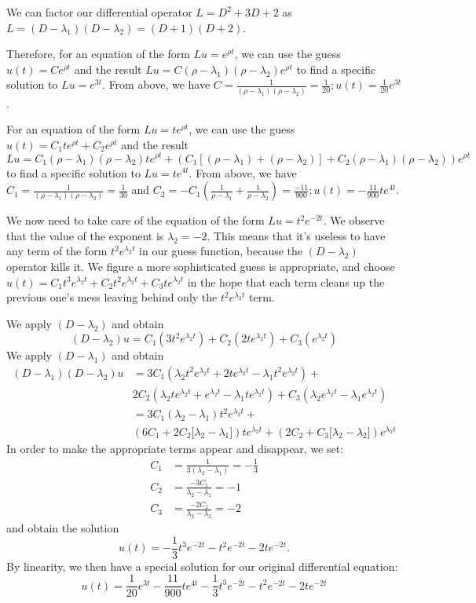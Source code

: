 \documentclass[11pt]{article}
\begin{document}
We can factor our differential operator $L=D^2 + 3D + 2$ as $L = (D-\lambda_1)(D-\lambda_2) = (D+1)(D+2)$. 

Therefore, for an equation of the form $Lu=e^{\rho t}$, we can use the guess $u(t) = Ce^{\rho t}$ and the result $Lu = C(\rho - \lambda_1)(\rho - \lambda_2)e^{\rho t}$ to find a specific solution to $Lu = e^{3t}$. From above, we have $C = \frac{1}{(\rho - \lambda_1)(\rho - \lambda_2)} = \frac{1}{20}; u(t) = \frac{1}{20} e^{3t}$.

For an equation of the form $Lu = te^{\rho t}$, we can use the guess $u(t) = C_1 te^{\rho t} + C_2 e^{\rho t}$ and the result $Lu = C_1(\rho - \lambda_1)(\rho - \lambda_2)te^{\rho t} + (C_1[(\rho - \lambda_1) + (\rho - \lambda_2)] + C_2(\rho - \lambda_1)(\rho - \lambda_2))e^{\rho t}$ to find a specific solution to $Lu = te^{4t}$. From above, we have $C_1 = \frac{1}{(\rho - \lambda_1)(\rho - \lambda_2)} = \frac{1}{30}$ and $C_2 = -C_1 (\frac{1}{\rho - \lambda_1} + \frac{1}{\rho - \lambda_2}) = \frac{-11}{900}; u(t) = -\frac{11}{900} te^{4t}$.

We now need to take care of the equation of the form $Lu = t^2 e^{-2t}$. We observe that the value of the exponent is $\lambda_2 = -2$. This means that it's useless to have any term of the form $t^2 e^{\lambda_2 t}$ in our guess function, because the $(D - \lambda_2)$ operator kills it. We figure a more sophisticated guess is appropriate, and choose $u(t) = C_1 t^3 e^{\lambda_2 t} + C_2 t^2 e^{\lambda_2 t} + C_3 t e^{\lambda_2 t}$ in the hope that each term cleans up the previous one's mess leaving behind only the $t^2 e^{\lambda_2 t}$ term.

We apply $(D - \lambda_2)$ and obtain
\[
(D - \lambda_2)u = C_1 (3t^2 e^{\lambda_2 t}) + C_2(2t e^{\lambda_2 t}) + C_3 (e^{\lambda_2 t})
\]
We apply $(D - \lambda_1)$ and obtain
\begin{align*}
(D - \lambda_1)(D - \lambda_2)u &= 3C_1(\lambda_2 t^2 e^{\lambda_2 t} + 2te^{\lambda_2 t} - \lambda_1 t^2 e^{\lambda_2 t}) + \\
& 2C_2(\lambda_2 t e^{\lambda_2 t} + e^{\lambda_2 t} - \lambda_1 te^{\lambda_2 t}) + C_3(\lambda_2 e^{\lambda_2 t} - \lambda_1 e^{\lambda_2 t}) \\
&= 3C_1 (\lambda_2 - \lambda_1)t^2 e^{\lambda_2 t} + \\
& (6C_1 + 2C_2 \big[\lambda_2 - \lambda_1\big])t e^{\lambda_2 t} + (2C_2 + C_3 \big[\lambda_2 - \lambda_2 \big])e^{\lambda_2 t}
\end{align*}
In order to make the appropriate terms appear and disappear, we set:
\begin{align*}
C_1 &= \frac{1}{3(\lambda_2 - \lambda_1)}  = -\frac{1}{3} \\
C_2 &= \frac{-3C_1}{\lambda_2 - \lambda_1} = -1\\
C_3 &= \frac{-2C_2}{\lambda_2 - \lambda_2} = -2
\end{align*}
and obtain the solution
\[
u(t) = -\frac{1}{3} t^3 e^{-2t} - t^2 e^{-2t} - 2t e^{-2t}.
\]
By linearity, we then have a special solution for our original differential equation:
\[
u(t) = \frac{1}{20} e^{3t} - \frac{11}{900} te^{4t} -\frac{1}{3} t^3 e^{-2t} - t^2 e^{-2t} - 2t e^{-2t}
\]
\end{document}
